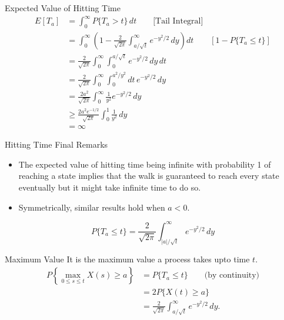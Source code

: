 \documentclass{beamer}
\begin{document}
	\begin{frame}{Expected Value of Hitting Time}
		\[
		\begin{aligned}
			E[T_a]
			&= \int_0^\infty P\{T_a > t\}\,dt \qquad \text{[Tail Integral]} \\[4pt]
			&= \int_0^\infty \left(1 - \frac{2}{\sqrt{2\pi}} \int_{a/\sqrt{t}}^\infty e^{-y^2/2}\,dy \right) dt \qquad [1-P\{T_a\le t\}] \\[4pt]
			&= \frac{2}{\sqrt{2\pi}} \int_0^\infty \int_0^{a/\sqrt{t}} e^{-y^2/2}\,dy\,dt \\[4pt]
			&= \frac{2}{\sqrt{2\pi}} \int_0^\infty \int_0^{a^2/y^2} dt\, e^{-y^2/2}\,dy \\[4pt]
			&= \frac{2a^2}{\sqrt{2\pi}} \int_0^\infty \frac{1}{y^2} e^{-y^2/2}\,dy \\[4pt]
			&\ge \frac{2a^2 e^{-1/2}}{\sqrt{2\pi}} \int_0^1 \frac{1}{y^2}\,dy \\[4pt]
			&= \infty
		\end{aligned}
		\]
	\end{frame}
	
	\begin{frame}{Hitting Time Final Remarks}
		\begin{itemize}
			\item The expected value of hitting time being infinite with probability 1 of reaching a state implies that the walk is guaranteed to reach every state eventually but it might take infinite time to do so.
			\item Symmetrically, similar results hold when $a<0$.
		\end{itemize}
		
		\begin{center}
			\[
			P\{T_a \le t\}
			=
			\frac{2}{\sqrt{2\pi}}
			\int_{|a|/\sqrt{t}}^\infty e^{-y^2/2}\,dy
			\]
		\end{center}
		
	\end{frame}
	
	\begin{frame}{Maximum Value}
		It is the maximum value a process takes upto time $t$.
		\[
		\begin{aligned}
			P\left\{ \max_{0 \le s \le t} X(s) \ge a \right\}
			&= P\{T_a \le t\}
			\qquad \text{(by continuity)} \\
			&= 2P\{X(t)\ge a\} \\
			&= \frac{2}{\sqrt{2\pi}} \int_{a/\sqrt{t}}^\infty e^{-y^2/2}\,dy.
		\end{aligned}
		\]
	\end{frame}
	
\end{document}
